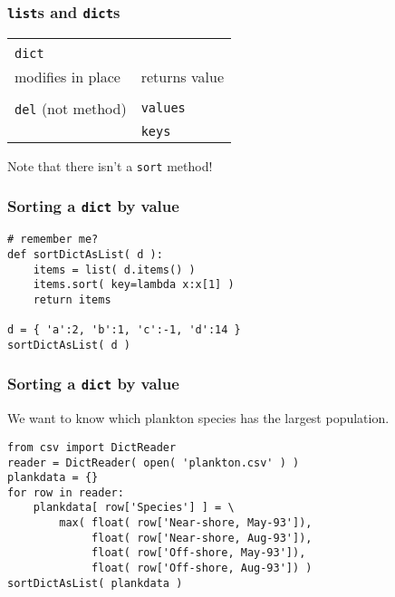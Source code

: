 \documentclass[11pt]{beamer}
\begin{document}
\begin{frame}[fragile]
  \frametitle{\texttt{list}s and \texttt{dict}s}
  \Enlarge

  \begin{tabular}{ll}
  \hline\hline \\
  \texttt{dict} & \\
  modifies in place \hspace{2cm} & returns value \\
  \hline \\
  \texttt{del} (not method) & \texttt{values} \\
   & \texttt{keys} \\
  \end{tabular} \pause
  \begin{enumerate}
  \myitem  Note that there isn't a \texttt{sort} method!
  \end{enumerate}
\end{frame}

\begin{frame}[fragile]
  \frametitle{Sorting a \texttt{dict} by value}

  \begin{Verbatim}
# remember me?
def sortDictAsList( d ):
    items = list( d.items() )
    items.sort( key=lambda x:x[1] )
    return items

d = { 'a':2, 'b':1, 'c':-1, 'd':14 }
sortDictAsList( d )
  \end{Verbatim}
\end{frame}

\begin{frame}[fragile]
  \frametitle{Sorting a \texttt{dict} by value}
  \Enlarge

  We want to know which plankton species has the largest population. \pause

  \begin{Verbatim}
from csv import DictReader
reader = DictReader( open( 'plankton.csv' ) )
plankdata = {}
for row in reader:
    plankdata[ row['Species'] ] = \
        max( float( row['Near-shore, May-93']),
             float( row['Near-shore, Aug-93']),
             float( row['Off-shore, May-93']),
             float( row['Off-shore, Aug-93']) )
sortDictAsList( plankdata )
  \end{Verbatim}
\end{frame}
\end{document}
